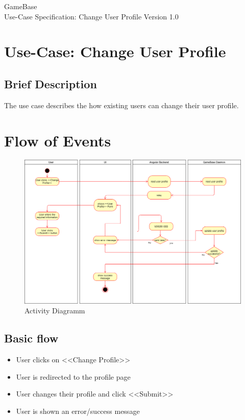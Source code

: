 \documentclass[a4paper,12pt,chapterprefix=false,bibliography=totoc,listof=totoc,book]{scrreprt}
\begin{document}
    \begin{flushright}
        GameBase
        \\
        Use-Case Specification: Change User Profile
        \bigbreak
        Version 1.0
    \end{flushright}

    \tableofcontents

    \chapter{Use-Case: Change User Profile}

    \section{Brief Description}
    The use case describes the how existing users can change their user profile.

    \chapter{Flow of Events}
    \begin{figure}[H]
        \includegraphics[width=\textwidth]{diagramms/UCChangeUserProfileDiagramm.png}
        \caption{Activity Diagramm}
        \label{fig:ucd}
    \end{figure}
    \section{Basic flow}

    \begin{itemize}
        \item User clicks on <<Change Profile>>
        \item User is redirected to the profile page
        \item User changes their profile and click <<Submit>>
        \item User is shown an error/success message
    \end{itemize}
\end{document}
